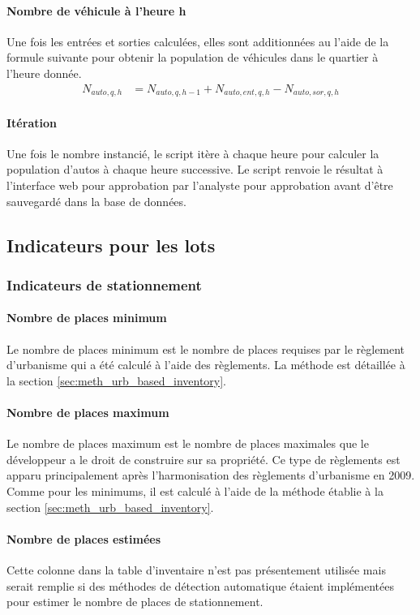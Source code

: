     \paragraph{Nombre de véhicule à l'heure h} Une fois les entrées et sorties calculées, elles sont additionnées au l'aide de la formule suivante pour obtenir la population de véhicules dans le quartier à l'heure donnée.
    \begin{align}
        N_{auto,q,h} &=  N_{auto,q,h-1} + N_{auto,ent,q,h}-N_{auto,sor,q,h}
    \end{align}
    \paragraph{Itération} Une fois le nombre instancié, le script itère à chaque heure pour calculer la population d'autos à chaque heure successive. Le script renvoie le résultat à l'interface web pour approbation par l'analyste pour approbation avant d'être sauvegardé dans la base de données.
    \subsection{Indicateurs pour les lots}
    \subsubsection{Indicateurs de stationnement}
    
    \paragraph{Nombre de places minimum} Le nombre de places minimum est le nombre de places requises par le règlement d'urbanisme qui a été calculé à l'aide des règlements. La méthode est détaillée à la section \ref{sec:meth_urb_based_inventory}.
    
    \paragraph{Nombre de places maximum} Le nombre de places maximum est le nombre de places maximales que le développeur a le droit de construire sur sa propriété. Ce type de règlements est apparu principalement après l'harmonisation des règlements d'urbanisme en 2009. Comme pour les minimums, il est calculé à l'aide de la méthode établie à la section \ref{sec:meth_urb_based_inventory}.
    
    \paragraph{Nombre de places estimées} Cette colonne dans la table d'inventaire n'est pas présentement utilisée mais serait remplie si des méthodes de détection automatique étaient implémentées pour estimer le nombre de places de stationnement.
    
